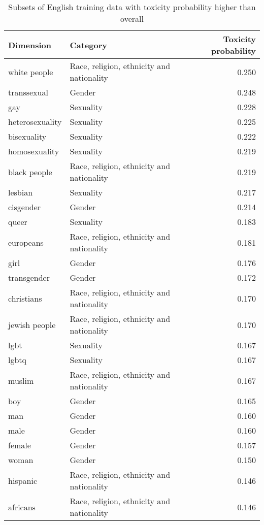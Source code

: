 \begin{table}[H]
\centering
\caption{Subsets of English training data with toxicity probability higher than overall}
\small

\begin{tabular}{llr}
\toprule
Dimension & Category & Toxicity probability \\
\midrule
white people & Race, religion, ethnicity and nationality & 0.250 \\
transsexual & Gender & 0.248 \\
gay & Sexuality & 0.228 \\
heterosexuality & Sexuality & 0.225 \\
bisexuality & Sexuality & 0.222 \\
homosexuality & Sexuality & 0.219 \\
black people & Race, religion, ethnicity and nationality & 0.219 \\
lesbian & Sexuality & 0.217 \\
cisgender & Gender & 0.214 \\
queer & Sexuality & 0.183 \\
europeans & Race, religion, ethnicity and nationality & 0.181 \\
girl & Gender & 0.176 \\
transgender & Gender & 0.172 \\
christians & Race, religion, ethnicity and nationality & 0.170 \\
jewish people & Race, religion, ethnicity and nationality & 0.170 \\
lgbt & Sexuality & 0.167 \\
lgbtq & Sexuality & 0.167 \\
muslim & Race, religion, ethnicity and nationality & 0.167 \\
boy & Gender & 0.165 \\
man & Gender & 0.160 \\
male & Gender & 0.160 \\
female & Gender & 0.157 \\
woman & Gender & 0.150 \\
hispanic & Race, religion, ethnicity and nationality & 0.146 \\
africans & Race, religion, ethnicity and nationality & 0.146 \\
\bottomrule
\end{tabular}

\label{tab:rai-dataset-analysis-higher-toxicity}
\end{table}
 
